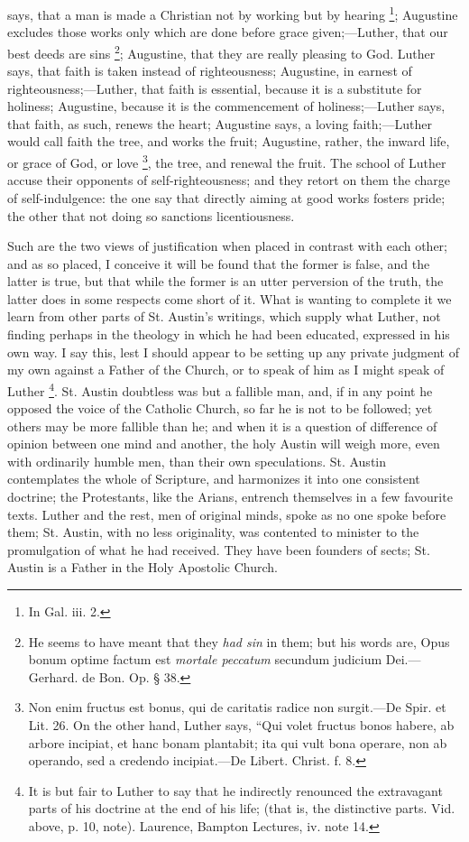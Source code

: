 says, that a man is made a Christian not by working but by hearing \footnote{In Gal. iii.
2.}; Augustine excludes those works only which are done before
grace given;—Luther, that our best deeds are sins \footnote{He seems to
have meant that they \emph{had sin} in them; but his words are, Opus
bonum optime factum est \emph{mortale peccatum} secundum judicium Dei.—Gerhard.
de Bon. Op. § 38.}; Augustine, that they are really pleasing to God. Luther says,
that faith is taken instead of righteousness; Augustine, in earnest of
righteousness;—Luther, that faith is essential, because it is a
substitute for holiness; Augustine, because it is the commencement of
holiness;—Luther says, that faith, as such, renews the heart;
Augustine says, a loving faith;—Luther would call faith the tree,
and works the fruit; Augustine, rather, the inward life, or grace of
God, or love \footnote{Non enim
fructus est bonus, qui de caritatis radice non surgit.—De Spir. et
Lit. 26. On the other hand, Luther says, ``Qui volet fructus bonos
habere, ab arbore incipiat, et hanc bonam plantabit; ita qui vult bona
operare, non ab operando, sed a credendo incipiat.—De Libert.
Christ. f. 8.}, the
tree, and renewal the fruit. The school of Luther accuse their
opponents of self-righteousness; and they retort on them the charge of
self-indulgence: the one say that directly aiming at good works
fosters pride; the other that not doing so sanctions licentiousness.

Such are the two views of justification when placed in contrast
with each other; and as so placed, I conceive it will be found that
the former is false, and the latter is true, but that while the former
is an utter perversion of the truth, the latter does in some respects
come short of it. What is wanting to complete it we learn from other
parts of St. Austin's writings, which supply what Luther, not finding
perhaps in the theology in which he had been educated, expressed in
his own way. I say this, lest I should appear to be setting up any
private judgment of my own against a Father of the Church, or to speak
of him as I might speak of Luther \footnote{It is but
fair to Luther to say that he indirectly renounced the extravagant
parts of his doctrine at the end of his life; (that is, the
distinctive parts. Vid. above, p. 10, note). Laurence, Bampton
Lectures, iv. note 14.}. St. Austin doubtless was but a fallible man, and, if in any
point he opposed the voice of the Catholic Church, so far he is not to
be followed; yet others may be more fallible than he; and when it is a
question of difference of opinion between one mind and another, the
holy Austin will weigh more, even with ordinarily humble men, than
their own speculations. St. Austin contemplates the whole of
Scripture, and harmonizes it into one consistent doctrine; the
Protestants, like the Arians, entrench themselves in a few favourite
texts. Luther and the rest, men of original minds, spoke as no one
spoke before them; St. Austin, with no less originality, was contented
to minister to the promulgation of what he had received. They have
been founders of sects; St. Austin is a Father in the Holy Apostolic
Church.

